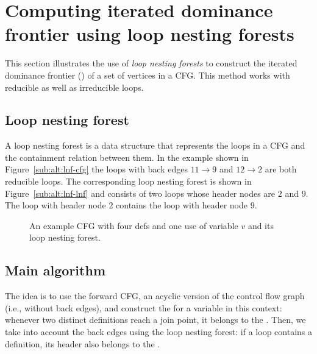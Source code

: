 {\begin{algorithm}
\end{algorithm}

\section{Computing iterated dominance frontier using loop nesting forests}
\label{section:alternative_ssa_construction_algorithms:loop}
This section illustrates the use of \emph{loop nesting forests} to construct the iterated dominance frontier (\iDF) of a set of vertices in a CFG. 
This method works with reducible as well as irreducible loops.


\subsection{Loop nesting forest}%
\label{sec:loop_nesting_forest}A loop nesting forest is a data structure that represents the loops in a CFG and the containment relation between them. 
In the example shown in Figure~\ref{sub:alt:lnf-cfg} the loops with back edges $11 \rightarrow 9$ and $12 \rightarrow 2$ are both reducible loops. 
The corresponding loop nesting forest is shown in Figure~\ref{sub:alt:lnf-lnf} and consists of two loops whose header nodes are $2$ and $9$. 
The loop with header node $2$ contains the loop with header node $9$.

\begin{figure}[t]     \hfill     {}     \hfill     {}     \hfill\null     \caption{An example CFG with four defs and one use of variable $v$ and its loop nesting forest.}
\label{fig:lnf} \end{figure} 

\subsection{Main algorithm}
The idea is to use the forward CFG, an acyclic version of the control flow graph (i.e., without back edges), and construct the \iDF for a variable in this context:  whenever two distinct definitions reach a join point, it belongs to the \iDF. 
Then, we take into account the back edges using the loop nesting forest:  if a loop contains a definition, its header also belongs to the \iDF.

}
